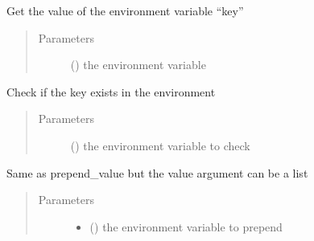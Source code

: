 \documentclass[a4paper,10pt,english]{sphinxmanual}
\begin{document}
\begin{fulllineitems}
\begin{fulllineitems}
\label{\detokenize{commands/apidoc/src:src.fileEnviron.LauncherFileEnviron.get}}
Get the value of the environment variable “key”
\begin{quote}\begin{description}
\item[{Parameters}] \leavevmode
{} () \textendash{} the environment variable

\end{description}\end{quote}

\end{fulllineitems}


\begin{fulllineitems}
\label{\detokenize{commands/apidoc/src:src.fileEnviron.LauncherFileEnviron.is_defined}}
Check if the key exists in the environment
\begin{quote}\begin{description}
\item[{Parameters}] \leavevmode
{} () \textendash{} the environment variable to check

\end{description}\end{quote}

\end{fulllineitems}


\begin{fulllineitems}
\label{\detokenize{commands/apidoc/src:src.fileEnviron.LauncherFileEnviron.prepend}}
Same as prepend\_value but the value argument can be a list
\begin{quote}\begin{description}
\item[{Parameters}] \leavevmode\begin{itemize}
\item {} 
 () \textendash{} the environment variable to prepend


\end{itemize}
\end{description}
\end{quote}
\end{fulllineitems}
\end{fulllineitems}
\end{document}
